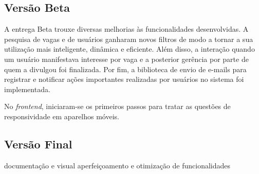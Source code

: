 \subsection{Versão Beta}
\label{implementacaoBR}

A entrega Beta trouxe diversas melhorias às funcionalidades desenvolvidas. A pesquisa de vagas e de usuários ganharam novos filtros de modo a tornar a sua utilização mais inteligente, dinâmica e eficiente. Além disso, a interação quando um usuário manifestava interesse por vaga e a posterior gerência por parte de quem a divulgou foi finalizada. Por fim, a biblioteca de envio de e-mails para registrar e notificar ações importantes realizadas por usuários no sistema foi implementada.

No \textit{frontend}, iniciaram-se os primeiros passos para tratar as questões de responsividade em aparelhos móveis.

\subsection{Versão Final}
\label{implementacaoFR}

documentação e visual
aperfeiçoamento e otimização de funcionalidades